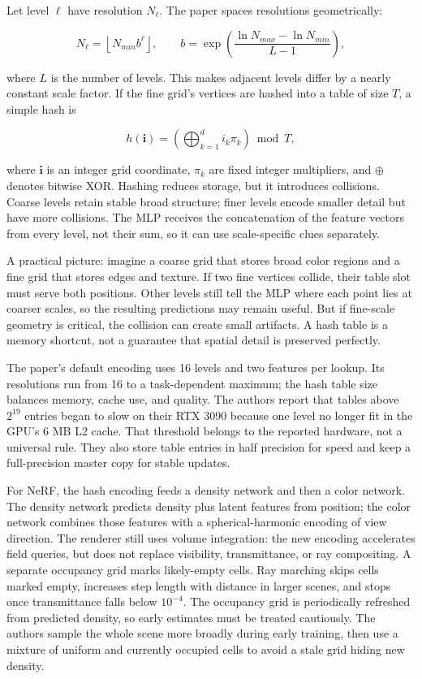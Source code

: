Let level \(\ell\) have resolution \(N_\ell\). The paper spaces resolutions geometrically:

\[N_\ell=\left\lfloor N_{min}b^\ell\right\rfloor,\qquad b=\exp\left(\frac{\ln N_{max}-\ln N_{min}}{L-1}\right),\]

where \(L\) is the number of levels. This makes adjacent levels differ by a nearly constant scale factor. If the fine grid's vertices are hashed into a table of size \(T\), a simple hash is

\[h(\mathbf{i})=\left(\bigoplus_{k=1}^{d}i_k\pi_k\right)\bmod T,\]

where \(\mathbf{i}\) is an integer grid coordinate, \(\pi_k\) are fixed integer multipliers, and \(\oplus\) denotes bitwise XOR. Hashing reduces storage, but it introduces collisions. Coarse levels retain stable broad structure; finer levels encode smaller detail but have more collisions. The MLP receives the concatenation of the feature vectors from every level, not their sum, so it can use scale-specific clues separately.

A practical picture: imagine a coarse grid that stores broad color regions and a fine grid that stores edges and texture. If two fine vertices collide, their table slot must serve both positions. Other levels still tell the MLP where each point lies at coarser scales, so the resulting predictions may remain useful. But if fine-scale geometry is critical, the collision can create small artifacts. A hash table is a memory shortcut, not a guarantee that spatial detail is preserved perfectly.

The paper's default encoding uses 16 levels and two features per lookup. Its resolutions run from 16 to a task-dependent maximum; the hash table size balances memory, cache use, and quality. The authors report that tables above \(2^{19}\) entries began to slow on their RTX 3090 because one level no longer fit in the GPU's 6 MB L2 cache. That threshold belongs to the reported hardware, not a universal rule. They also store table entries in half precision for speed and keep a full-precision master copy for stable updates.

For NeRF, the hash encoding feeds a density network and then a color network. The density network predicts density plus latent features from position; the color network combines those features with a spherical-harmonic encoding of view direction. The renderer still uses volume integration: the new encoding accelerates field queries, but does not replace visibility, transmittance, or ray compositing. A separate occupancy grid marks likely-empty cells. Ray marching skips cells marked empty, increases step length with distance in larger scenes, and stops once transmittance falls below \(10^{-4}\). The occupancy grid is periodically refreshed from predicted density, so early estimates must be treated cautiously. The authors sample the whole scene more broadly during early training, then use a mixture of uniform and currently occupied cells to avoid a stale grid hiding new density.

